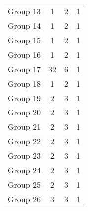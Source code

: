 \begin{table}[H]
\begin{tabular}{@{}rccc@{}}
        Group 13 & 1                                         & 2                                          & 1                                      \\
        Group 14 & 1                                         & 2                                          & 1                                      \\
        Group 15 & 1                                         & 2                                          & 1                                      \\
        Group 16 & 1                                         & 2                                          & 1                                      \\
        Group 17 & 32                                        & 6                                          & 1                                      \\
        Group 18 & 1                                         & 2                                          & 1                                      \\
        Group 19 & 2                                         & 3                                          & 1                                      \\
        Group 20 & 2                                         & 3                                          & 1                                      \\
        Group 21 & 2                                         & 3                                          & 1                                      \\
        Group 22 & 2                                         & 3                                          & 1                                      \\
        Group 23 & 2                                         & 3                                          & 1                                      \\
        Group 24 & 2                                         & 3                                          & 1                                      \\
        Group 25 & 2                                         & 3                                          & 1                                      \\
        Group 26 & 3                                         & 3                                          & 1                                      \\

\end{tabular}
\end{table}
